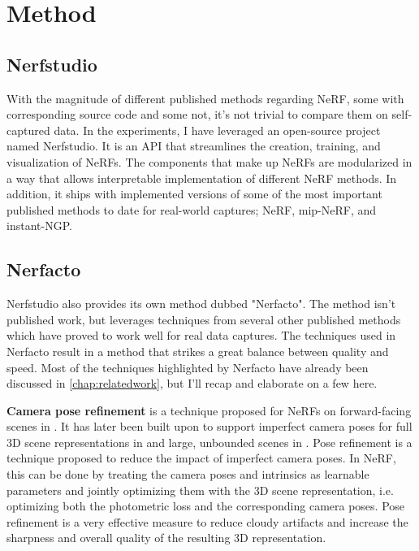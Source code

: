 \chapter{Method}

\begin{comment}
Beskriv pipeline for å generere NeRFs

- Capture (video, image, polycam, etc.)
- Process (COLMAP, or direct extraction from e.g. Polycam)
    - Configuration of COLMAP
- Train (Different models)
    - Configuration of model
- Render (Real-time rendering vs. slow rendering)
- Evaluate (PSNR, SSIM, LPIPS)
- Export

- Pipelines created
    - Pipeline to test 
\end{comment}

\section{Nerfstudio}
With the magnitude of different published methods regarding NeRF, some with corresponding source code and some not, it's not trivial to compare them on self-captured data. In the experiments, I have leveraged an open-source project named Nerfstudio. It is an API that streamlines the creation, training, and visualization of NeRFs. The components that make up NeRFs are modularized in a way that allows interpretable implementation of different NeRF methods. In addition, it ships with implemented versions of some of the most important published methods to date for real-world captures; NeRF, mip-NeRF, and instant-NGP.

\section{Nerfacto}
Nerfstudio also provides its own method dubbed "Nerfacto". The method isn't published work, but leverages techniques from several other published methods which have proved to work well for real data captures. The techniques used in Nerfacto result in a method that strikes a great balance between quality and speed. Most of the techniques highlighted by Nerfacto have already been discussed in \autoref{chap:relatedwork}, but I'll recap and elaborate on a few here.

\textbf{Camera pose refinement} is a technique proposed for NeRFs on forward-facing scenes in \cite{wang_nerf--_2022}. It has later been built upon to support imperfect camera poses for full 3D scene representations in \cite{lin_barf_2021} and large, unbounded scenes in \cite{tancik_block-nerf_2022}. Pose refinement is a technique proposed to reduce the impact of imperfect camera poses. In NeRF, this can be done by treating the camera poses and intrinsics as learnable parameters and jointly optimizing them with the 3D scene representation, i.e. optimizing both the photometric loss and the corresponding camera poses. Pose refinement is a very effective measure to reduce cloudy artifacts and increase the sharpness and overall quality of the resulting 3D representation.

